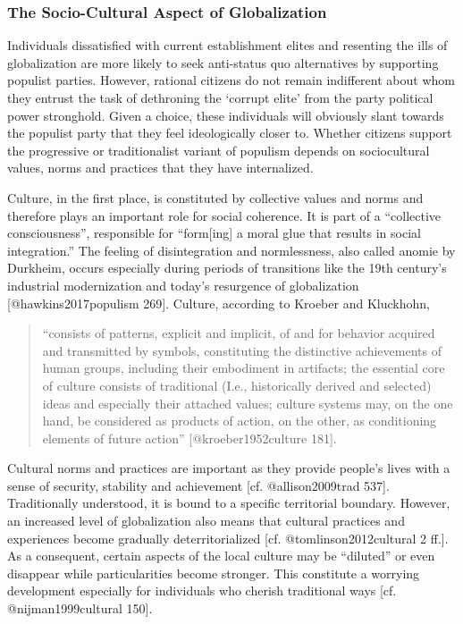 \documentclass[]{article}
\begin{document}
\subsubsection{The Socio-Cultural Aspect of
Globalization}\label{the-socio-cultural-aspect-of-globalization}

Individuals dissatisfied with current establishment elites and resenting
the ills of globalization are more likely to seek anti-status quo
alternatives by supporting populist parties. However, rational citizens
do not remain indifferent about whom they entrust the task of dethroning
the `corrupt elite' from the party political power stronghold. Given a
choice, these individuals will obviously slant towards the populist
party that they feel ideologically closer to. Whether citizens support
the progressive or traditionalist variant of populism depends on
sociocultural values, norms and practices that they have internalized.

Culture, in the first place, is constituted by collective values and
norms and therefore plays an important role for social coherence. It is
part of a ``collective consciousness'', responsible for ``form{[}ing{]}
a moral glue that results in social integration.'' The feeling of
disintegration and normlessness, also called anomie by Durkheim, occurs
especially during periods of transitions like the 19th century's
industrial modernization and today's resurgence of globalization
{[}@hawkins2017populism 269{]}. Culture, according to Kroeber and
Kluckhohn,

\begin{quote}
``consists of patterns, explicit and implicit, of and for behavior
acquired and transmitted by symbols, constituting the distinctive
achievements of human groups, including their embodiment in artifacts;
the essential core of culture consists of traditional (I.e.,
historically derived and selected) ideas and especially their attached
values; culture systems may, on the one hand, be considered as products
of action, on the other, as conditioning elements of future action''
{[}@kroeber1952culture 181{]}.
\end{quote}

Cultural norms and practices are important as they provide people's
lives with a sense of security, stability and achievement {[}cf.
@allison2009trad 537{]}. Traditionally understood, it is bound to a
specific territorial boundary. However, an increased level of
globalization also means that cultural practices and experiences become
gradually deterritorialized {[}cf. @tomlinson2012cultural 2 ff.{]}. As a
consequent, certain aspects of the local culture may be ``diluted'' or
even disappear while particularities become stronger. This constitute a
worrying development especially for individuals who cherish traditional
ways {[}cf. @nijman1999cultural 150{]}.
\end{document}
